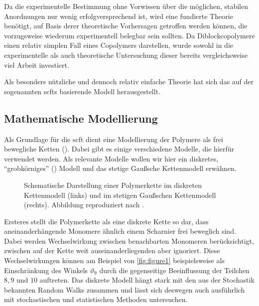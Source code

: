 Da die experimentelle Bestimmung ohne Vorwissen über die möglichen, stabilen Anordnungen nur wenig erfolgversprechend ist, wird eine fundierte Theorie benötigt, auf Basis derer theoretische Vorhersagen getroffen werden können, die vorzugsweise wiederum experimentell belegbar sein sollten.
Da Diblockcopolymere einen relativ simplen Fall eines Copolymers darstellen, wurde sowohl in die experimentelle als auch theoretische Untersuchung dieser bereits vergleichsweise viel Arbeit investiert.

Als besonders nützliche und dennoch relativ einfache Theorie hat sich das auf der sogenannten \acp{scft} basierende Modell herausgestellt.

\subsection*{Mathematische Modellierung} %
\label{sub:mathematische_modellierung}


Als Grundlage für die \acl{scft} dient eine Modellierung der Polymere als frei bewegliche Ketten ().
Dabei gibt es einige verschiedene Modelle, die hierfür verwendet werden.
Als relevante Modelle wollen wir hier ein diskretes, \enquote{grobkörniges} () Modell und das stetige Gaußsche Kettenmodell erwähnen.

\begin{figure}[tb]
    \centering
        
    \caption[%
        Polymerkette in diskretem und Gaußschen Kettenmodell
    ]{%
        Schematische Darstellung einer Polymerkette im diskreten Kettenmodell (links) und im stetigen Gaußschen Kettenmodell (rechts).
        Abbildung reproduziert nach \cite[Figure 2.1 und 2.5]{Fredrickson:2006th}.
    }
    \label{fig:figure1}
\end{figure}

Ersteres stellt die Polymerkette als eine diskrete Kette so dar, dass aneinanderhängende Monomere ähnlich einem Scharnier frei beweglich sind.
Dabei werden Wechselwirkung zwischen benachbarten Monomeren berücksichtigt, zwischen auf der Kette weit auseinanderliegenden aber ignoriert.
Diese Wechselwirkungen können am Beispiel von \autoref{fig:figure1} beispielsweise als Einschränkung des Winkels $\vartheta_9$ durch die gegenseitige Beeinflussung der Teilchen $8, 9$ und $10$ auftreten.
Das diskrete Modell hängt stark mit den aus der Stochastik bekannten Random Walks zusammen und lässt sich deswegen auch ausführlich mit stochastischen und statistischen Methoden untersuchen.

